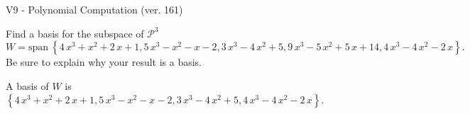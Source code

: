 \begin{exercise}
  \begin{exerciseTitle}V9 - Polynomial Computation (ver. 161)\end{exerciseTitle}
  \begin{exerciseStatement}
    Find a basis for the subspace of \(\mathcal{P}^3\) 
\[W=\mathrm{span}\ \left\{4 \, x^{3} + x^{2} + 2 \, x + 1 , 5 \, x^{3} - x^{2} - x - 2 , 3 \, x^{3} - 4 \, x^{2} + 5 , 9 \, x^{3} - 5 \, x^{2} + 5 \, x + 14 , 4 \, x^{3} - 4 \, x^{2} - 2 \, x\right\}.\]
 Be sure to explain why your result is a basis.


  \end{exerciseStatement}
  \begin{exerciseAnswer}
   A basis of \(W\) is  \(\left\{4 \, x^{3} + x^{2} + 2 \, x + 1 , 5 \, x^{3} - x^{2} - x - 2 , 3 \, x^{3} - 4 \, x^{2} + 5 , 4 \, x^{3} - 4 \, x^{2} - 2 \, x\right\}\).
  


  \end{exerciseAnswer}
\end{exercise}